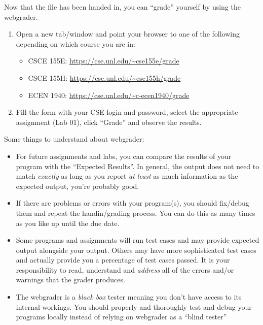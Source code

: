 \documentclass[12pt]{scrartcl}
\begin{document}
Now that the file has been handed in, you can ``grade'' yourself 
by using the webgrader.

\begin{enumerate}
  \item Open a new tab/window and point your browser to one of 
  the following depending on which course you are in:
  \begin{itemize}
    \item CSCE 155E: \url{https://cse.unl.edu/~cse155e/grade}
    \item CSCE 155H: \url{https://cse.unl.edu/~cse155h/grade}
    \item ECEN 1940: \url{https://cse.unl.edu/~c-ecen1940/grade}
  \end{itemize}
  \item Fill the form with your CSE login and password, select 
  the appropriate assignment (Lab 01), click ``Grade'' and
  observe the results.
\end{enumerate}

Some things to understand about webgrader:
\begin{itemize}
  \item For future assignments and labs, you can compare the results of 
  	your program with the ``Expected Results''.  In general, the output
	does not need to match \emph{exactly} as long as you report \emph{at least}
	as much information as the expected output, you're probably good.
  \item If there are problems or errors with your program(s), 
    you should fix/debug them and repeat the handin/grading process.
	You can do this as many times as you like up until the due date.  
  \item Some programs 
	and assignments will run test cases and may provide expected output alongside 
	your output.  Others may have more sophisticated test cases and actually provide 
	you a percentage of test cases passed.  It is your responsibility to read, 
	understand and \emph{address} all of the errors and/or warnings that the grader produces.
  \item The webgrader is a \emph{black box} tester meaning you don't have
  access to its internal workings.  You should properly and thoroughly test
  and debug your programs locally instead of relying on webgrader as a 
  ``blind tester''
\end{itemize}
\end{document}
